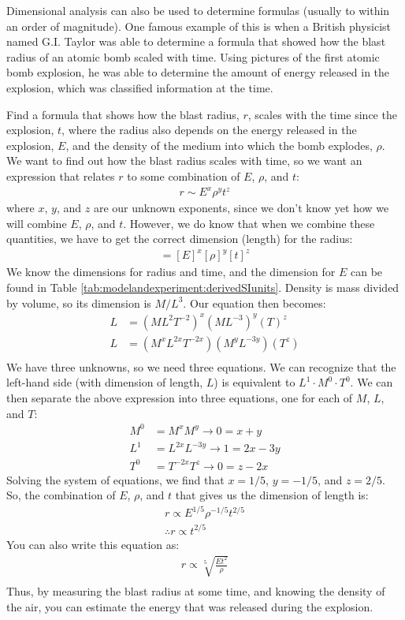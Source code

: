 Dimensional analysis can also be used to determine formulas (usually to within an order of magnitude). One famous example of this is when a British physicist named G.I. Taylor was able to determine a formula that showed how the blast radius of an atomic bomb scaled with time. Using pictures of the first atomic bomb explosion, he was able to determine the amount of energy released in the explosion, which was classified information at the time. 
\newpage
\begin{example}{Find a formula that shows how the blast radius, $r$, scales with the time since the explosion, $t$, where the radius also depends on the energy released in the explosion, $E$, and the density of the medium into which the bomb explodes, $\rho$.} 
We want to find out how the blast radius scales with time, so we want an expression that relates $r$ to some combination of $E$, $\rho$, and $t$:
\begin{align*}
r \sim E^x\rho^y t^z
\end{align*} 
where $x$, $y$, and $z$ are our unknown exponents, since we don't know yet how we will combine $E$, $\rho$, and $t$. However, we do know that when we combine these quantities, we have to get the correct dimension (length) for the radius:
\begin{align*}
[r]=[E]^x[\rho]^y[t]^z
\end{align*}
We know the dimensions for radius and time, and the dimension for $E$ can be found in Table \ref{tab:modelandexperiment:derivedSIunits}. Density is mass divided by volume, so its dimension is $M/L^3$. Our equation then becomes:
\begin{align*}
L&=(ML^2T^{-2})^x(ML^{-3})^y(T)^z\\
L&=(M^xL^{2x}T^{-2x})(M^yL^{-3y})(T^z)\\
\end{align*}
We have three unknowns, so we need three equations. We can recognize that the left-hand side (with dimension of length, $L$) is equivalent to $L^1\cdot M^0\cdot T^0$. We can then separate the above expression into three equations, one for each of $M$, $L$, and $T$: 
\begin{align*}
M^0&=M^xM^y \rightarrow 0 = x+y\\
L^1&=L^{2x}L^{-3y} \rightarrow 1=2x-3y\\
T^0&=T^{-2x}T^{z} \rightarrow 0=z-2x
\end{align*}
Solving the system of equations, we find that $x=1/5$, $y=-1/5$, and $z=2/5$. 
So, the combination of $E$, $\rho$, and $t$ that gives us the dimension of length is:
\begin{align*}
r\propto E^{1/5}\rho^{-1/5}t^{2/5}\\
\therefore r\propto t^{2/5}
\end{align*}
You can also write this equation as:
\begin{align*}
r\propto \sqrt[5]{\frac{Et^2}{\rho}}\\
\end{align*}
Thus, by measuring the blast radius at some time, and knowing the density of the air, you can estimate the energy that was released during the explosion.
\end{example}

